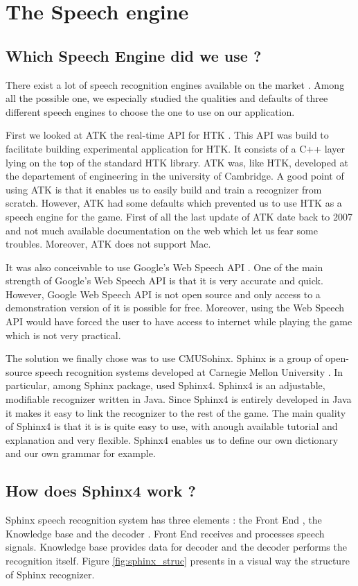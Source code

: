 \section*{The Speech engine}
\subsection*{Which Speech Engine did we use ?}
There exist a lot of speech recognition engines available on the market \cite{list_rec_soft}. Among all the possible one, we especially studied the qualities and defaults of three different speech engines to choose the one to use on our application. 

First we looked at ATK the real-time API for HTK \cite{atk}. This API was build to facilitate building experimental application for HTK. It consists of a C++ layer lying on the top of the standard HTK library. ATK was, like HTK, developed at the departement of engineering in the university of Cambridge. A good point of using ATK is that it enables us to easily build and train a recognizer from scratch. However, ATK had some defaults which prevented us to use HTK as a speech engine for the game. First of all the last update of ATK date back to 2007 and not much available documentation on the web which let us fear some troubles. Moreover, ATK does not support Mac. 

It was also conceivable to use Google's Web Speech API \cite{google_speech_api}. One of the main strength of Google's Web Speech API is that it is very accurate and quick. However, Google Web Speech API is not open source and only access to a demonstration version of it is possible for free. Moreover, using the Web Speech API would have forced  the user to have access to internet while playing the game which is not very practical. 

The solution we finally chose was to use CMUSohinx. Sphinx is a group of open-source speech recognition systems developed at Carnegie Mellon University \cite{sphinx}. In particular, among Sphinx package, used Sphinx4. Sphinx4 is an adjustable, modifiable recognizer written in Java. Since Sphinx4 is entirely developed in Java it makes it easy to link the recognizer to the rest of the game. The main quality of Sphinx4 is that it is is quite easy to use, with anough available tutorial and explanation and very flexible. Sphinx4 enables us to define our own dictionary and our own grammar for example. 

\subsection*{How does Sphinx4 work ?}
Sphinx speech recognition system has three elements : the Front End , the Knowledge base and the decoder . Front End receives and processes speech signals. Knowledge base provides data for decoder and the decoder performs the recognition itself. Figure \ref{fig:sphinx_struc} presents in a visual way the structure of Sphinx recognizer. 

